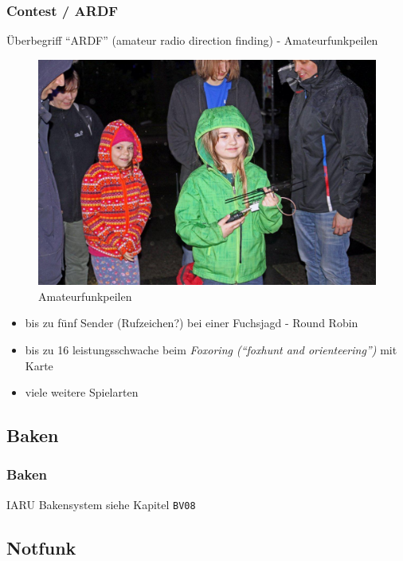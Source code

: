\begin{frame}
  \frametitle{Contest / ARDF}

  Überbegriff ``ARDF'' (amateur radio direction finding) - Amateurfunkpeilen

  \begin{center}
    \begin{figure}
      \includegraphics[width=.6\textwidth,height=.4\textheight,keepaspectratio]{bv10/IMG_1910.jpg}
      \caption{Amateurfunkpeilen \hyperlink{refs}{\cite{blog}}}
    \end{figure}
  \end{center}

  \begin{itemize}
    \item bis zu fünf Sender (Rufzeichen?) bei einer Fuchsjagd - Round Robin
    \item bis zu 16 leistungsschwache beim \emph{Foxoring (``foxhunt and
      orienteering'')} mit Karte
    \item viele weitere Spielarten
  \end{itemize}

\end{frame}

\subsection{Baken}

\begin{frame}
  \frametitle{Baken}

  IARU Bakensystem siehe Kapitel \texttt{BV08}

\end{frame}

\subsection{Notfunk}


